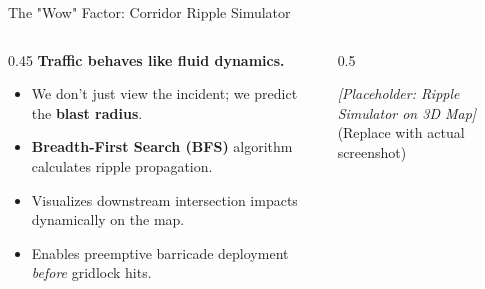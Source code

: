\documentclass[aspectratio=169, xcolor=table]{beamer}
\newcommand{\demoPlaceholder}[2]{
    \begin{tcolorbox}[colback=SentinelSurfaceRaised, colframe=SentinelSurfaceRaised, arc=4mm, height=#1, valign=center, halign=center]
        \textcolor{SentinelTextSec}{\Large \textit{[Placeholder: #2]}} \\
        \vspace{2mm}
        \textcolor{SentinelTextSec}{\small (Replace with actual screenshot)}
    \end{tcolorbox}
}
\begin{document}
\begin{frame}{The "Wow" Factor: Corridor Ripple Simulator}
    \begin{columns}[T]
        \begin{column}{0.45\textwidth}
            \vspace{0.5cm}
            {\Large \textbf{Traffic behaves like fluid dynamics.}}
            \vspace{0.4cm}
            
            \begin{tcolorbox}[sentinelcard]
                \begin{itemize}
                    \item We don't just view the incident; we predict the \textbf{blast radius}.
                    \item \textbf{Breadth-First Search (BFS)} algorithm calculates ripple propagation.
                    \item Visualizes downstream intersection impacts dynamically on the map.
                    \item Enables preemptive barricade deployment \textit{before} gridlock hits.
                \end{itemize}
            \end{tcolorbox}
        \end{column}
        
        \begin{column}{0.5\textwidth}
            \demoPlaceholder{6.5cm}{Ripple Simulator on 3D Map}
        \end{column}
    \end{columns}
\end{frame}
\end{document}
